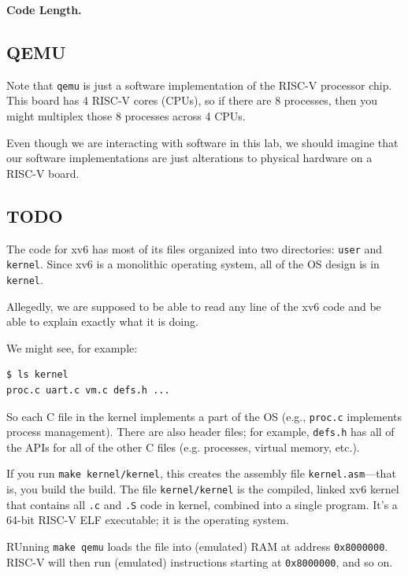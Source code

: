 \textbf{Code Length.}

\subsection{QEMU}

Note that \verb|qemu| is just a software implementation of
the RISC-V processor chip.
This board has 4 RISC-V cores (CPUs),
so if there are 8 processes,
then you might multiplex those 8 processes across 4 CPUs.

Even though we are interacting with software in this lab,
we should imagine that our software implementations
are just alterations to physical hardware on a RISC-V board.

\subsection{TODO}

The code for xv6 has most of its files organized into two directories:
\verb|user| and \verb|kernel|.
Since xv6 is a monolithic operating system,
all of the OS design is in \verb|kernel|.

\begin{remark}
    Allegedly, we are supposed to be able to
    read any line of the xv6 code
    and be able to explain exactly what it is doing.
\end{remark}

We might see, for example:

\begin{verbatim}
$ ls kernel
proc.c uart.c vm.c defs.h ...
\end{verbatim}

So each C file in the kernel implements a part of the OS
(e.g., \verb|proc.c| implements process management).
There are also header files;
for example, \verb|defs.h| has all of the APIs for all of the other C files
(e.g. processes, virtual memory, etc.).

If you run \verb|make kernel/kernel|,
this creates the assembly file \verb|kernel.asm|---that is,
you build the build.
The file \verb|kernel/kernel| is the compiled, linked xv6 kernel
that contains all \verb|.c| and \verb|.S| code in kernel,
combined into a single program.
It's a 64-bit RISC-V ELF executable;
it is the operating system.

RUnning \verb|make qemu| loads the file
into (emulated) RAM at address \verb|0x8000000|.
RISC-V will then run (emulated) instructions
starting at \verb|0x8000000|, and so on.


